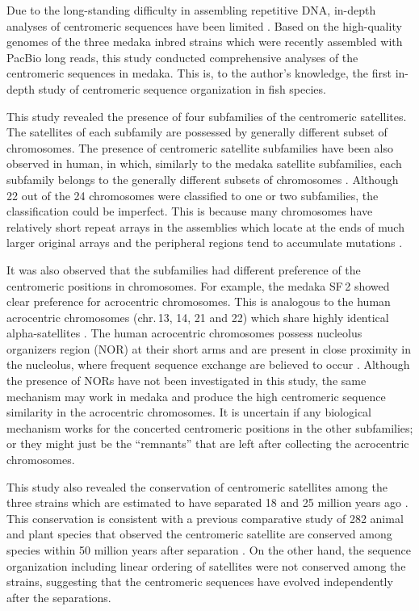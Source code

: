 Due to the long-standing difficulty in assembling repetitive DNA, in-depth analyses of centromeric sequences have been limited \cite{Plohl2014}. Based on the high-quality genomes of the three medaka inbred strains which were recently assembled with PacBio long reads, this study conducted comprehensive analyses of the centromeric sequences in medaka. This is, to the author's knowledge, the first in-depth study of centromeric sequence organization in fish species.

This study revealed the presence of four subfamilies of the centromeric satellites. The satellites of each subfamily are possessed by generally different subset of chromosomes. The presence of centromeric satellite subfamilies have been also observed in human, in which, similarly to the medaka satellite subfamilies, each subfamily belongs to the generally different subsets of chromosomes \cite{Alexandrov2001}. Although 22 out of the 24 chromosomes were classified to one or two subfamilies, the classification could be imperfect. This is because many chromosomes have relatively short repeat arrays in the assemblies which locate at the ends of much larger original arrays and the peripheral regions tend to accumulate mutations \cite{Smith1976, Schueler2001}.

It was also observed that the subfamilies had different preference of the centromeric positions in chromosomes. For example, the medaka SF\,2 showed clear preference for acrocentric chromosomes. This is analogous to the human acrocentric chromosomes (chr.\,13, 14, 21 and 22) which share highly identical alpha-satellites \cite{Willard1991}. The human acrocentric chromosomes possess nucleolus organizers region (NOR) at their short arms and are present in close proximity in the nucleolus, where frequent sequence exchange are believed to occur \cite{Willard1991}. Although the presence of NORs have not been investigated in this study, the same mechanism may work in medaka and produce the high centromeric sequence similarity in the acrocentric chromosomes. It is uncertain if any biological mechanism works for the concerted centromeric positions in the other subfamilies; or they might just be the ``remnants'' that are left after collecting the acrocentric chromosomes.

This study also revealed the conservation of centromeric satellites among the three strains which are estimated to have separated 18 and 25 million years ago \cite{Setiamarga2009}. This conservation is consistent with a previous comparative study of 282 animal and plant species that observed the centromeric satellite are conserved among species within 50 million years after separation \cite{Melters2013}. On the other hand, the sequence organization including linear ordering of satellites were not conserved among the strains, suggesting that the centromeric sequences have evolved independently after the separations.

